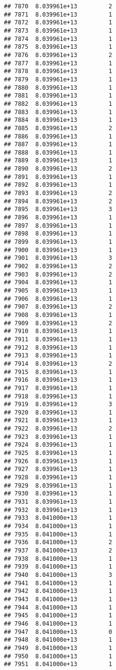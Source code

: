 \documentclass[
]{article}
\begin{document}
\begin{verbatim}
## 7870  8.039961e+13         2
## 7871  8.039961e+13         1
## 7872  8.039961e+13         1
## 7873  8.039961e+13         1
## 7874  8.039961e+13         1
## 7875  8.039961e+13         1
## 7876  8.039961e+13         2
## 7877  8.039961e+13         1
## 7878  8.039961e+13         1
## 7879  8.039961e+13         1
## 7880  8.039961e+13         1
## 7881  8.039961e+13         1
## 7882  8.039961e+13         1
## 7883  8.039961e+13         1
## 7884  8.039961e+13         1
## 7885  8.039961e+13         2
## 7886  8.039961e+13         1
## 7887  8.039961e+13         1
## 7888  8.039961e+13         1
## 7889  8.039961e+13         1
## 7890  8.039961e+13         2
## 7891  8.039961e+13         1
## 7892  8.039961e+13         1
## 7893  8.039961e+13         2
## 7894  8.039961e+13         2
## 7895  8.039961e+13         3
## 7896  8.039961e+13         1
## 7897  8.039961e+13         1
## 7898  8.039961e+13         1
## 7899  8.039961e+13         1
## 7900  8.039961e+13         1
## 7901  8.039961e+13         3
## 7902  8.039961e+13         2
## 7903  8.039961e+13         2
## 7904  8.039961e+13         1
## 7905  8.039961e+13         1
## 7906  8.039961e+13         1
## 7907  8.039961e+13         2
## 7908  8.039961e+13         1
## 7909  8.039961e+13         2
## 7910  8.039961e+13         1
## 7911  8.039961e+13         1
## 7912  8.039961e+13         1
## 7913  8.039961e+13         1
## 7914  8.039961e+13         2
## 7915  8.039961e+13         1
## 7916  8.039961e+13         1
## 7917  8.039961e+13         1
## 7918  8.039961e+13         1
## 7919  8.039961e+13         3
## 7920  8.039961e+13         1
## 7921  8.039961e+13         1
## 7922  8.039961e+13         2
## 7923  8.039961e+13         1
## 7924  8.039961e+13         1
## 7925  8.039961e+13         1
## 7926  8.039961e+13         1
## 7927  8.039961e+13         1
## 7928  8.039961e+13         1
## 7929  8.039961e+13         1
## 7930  8.039961e+13         1
## 7931  8.039961e+13         1
## 7932  8.039961e+13         1
## 7933  8.041000e+13         1
## 7934  8.041000e+13         1
## 7935  8.041000e+13         1
## 7936  8.041000e+13         2
## 7937  8.041000e+13         2
## 7938  8.041000e+13         1
## 7939  8.041000e+13         1
## 7940  8.041000e+13         3
## 7941  8.041000e+13         1
## 7942  8.041000e+13         1
## 7943  8.041000e+13         1
## 7944  8.041000e+13         1
## 7945  8.041000e+13         1
## 7946  8.041000e+13         1
## 7947  8.041000e+13         0
## 7948  8.041000e+13         1
## 7949  8.041000e+13         1
## 7950  8.041000e+13         1
## 7951  8.041000e+13         1

\end{verbatim}
\end{document}

